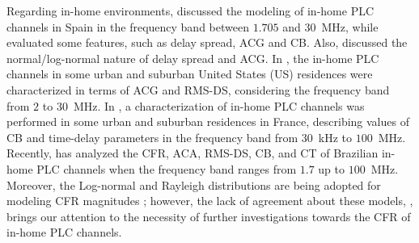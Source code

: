 \documentclass[journal]{IEEEtran}
\begin{document}
Regarding in-home environments, \cite{Canete:Model} discussed the modeling of in-home \ac{PLC} channels in Spain in the frequency band between $1.705$ and $30$~MHz, while \cite{Canete:PLC} evaluated some features, such as delay spread, \ac{ACG} and \ac{CB}. Also, \cite{Cortes:PLC} discussed the normal/log-normal nature of delay spread and \ac{ACG}. In \cite{GalliUS,Galli:Wireline}, the in-home \ac{PLC} channels in some urban and suburban United States (US) residences were characterized in terms of \ac{ACG} and \ac{RMS-DS}, considering the frequency band from $2$ to $30$~MHz. In \cite{Tlich:Indoor}, a characterization of in-home \ac{PLC} channels was performed in some urban and suburban residences in France, describing values of \ac{CB} and time-delay parameters in the frequency band from $30$~kHz to $100$~MHz. Recently, \cite{Thiago:Characterization} has analyzed the \ac{CFR}, \ac{ACA}, \ac{RMS-DS}, \ac{CB}, and \ac{CT} of Brazilian in-home \ac{PLC} channels when the frequency band ranges from $1.7$ up to $100$~MHz.  Moreover, the Log-normal and Rayleigh distributions are being adopted for modeling \ac{CFR} magnitudes \cite{Galli:Wireline,RayleighPLC}; however, the lack of agreement about these models, \cite{Cortes:PLC}, brings our attention to the necessity of further investigations towards the \ac{CFR} of in-home \ac{PLC} channels. 

\end{document}
